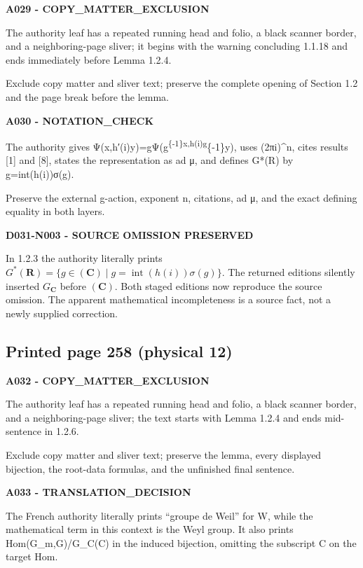 \documentclass[10pt,a4paper]{article}
\begin{document}
\textbf{A029 - COPY\_MATTER\_EXCLUSION}

The authority leaf has a repeated running head and folio, a black scanner border, and a neighboring-page sliver; it begins with the warning concluding 1.1.18 and ends immediately before Lemma 1.2.4.

Exclude copy matter and sliver text; preserve the complete opening of Section 1.2 and the page break before the lemma.

\textbf{A030 - NOTATION\_CHECK}

The authority gives Ψ(x,h′(i)y)=gΨ(g\textsuperscript{\{-1\}x,h(i)g}\{-1\}y), uses (2πi)\^{}n, cites results {[}1{]} and {[}8{]}, states the representation as ad μ, and defines G*(R) by g=int(h(i))σ(g).

Preserve the external g-action, exponent n, citations, ad μ, and the exact defining equality in both layers.

\textbf{D031-N003 - SOURCE OMISSION PRESERVED}

In 1.2.3 the authority literally prints \(G^*(\mathbf R)=\{g\in(\mathbf C)\mid g=\operatorname{int}(h(i))\sigma(g)\}\). The returned editions silently inserted \(G_{\mathbf C}\) before \((\mathbf C)\). Both staged editions now reproduce the source omission. The apparent mathematical incompleteness is a source fact, not a newly supplied correction.

\subsection{Printed page 258 (physical 12)}

\textbf{A032 - COPY\_MATTER\_EXCLUSION}

The authority leaf has a repeated running head and folio, a black scanner border, and a neighboring-page sliver; the text starts with Lemma 1.2.4 and ends mid-sentence in 1.2.6.

Exclude copy matter and sliver text; preserve the lemma, every displayed bijection, the root-data formulas, and the unfinished final sentence.

\textbf{A033 - TRANSLATION\_DECISION}

The French authority literally prints ``groupe de Weil'' for W, while the mathematical term in this context is the Weyl group. It also prints Hom(G\_m,G)/G\_C(C) in the induced bijection, omitting the subscript C on the target Hom.
\end{document}
